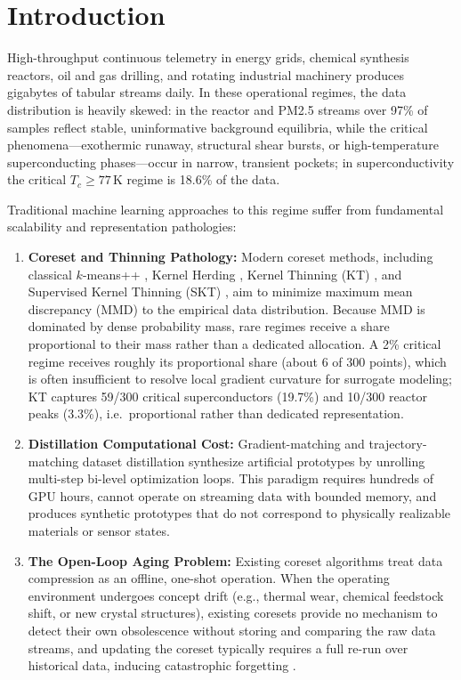 \documentclass[11pt,a4paper]{article}
\begin{document}
\section{Introduction}

High-throughput continuous telemetry in energy grids, chemical synthesis reactors, oil and gas drilling, and rotating industrial machinery produces gigabytes of tabular streams daily. In these operational regimes, the data distribution is heavily skewed: in the reactor and PM2.5 streams over 97\% of samples reflect stable, uninformative background equilibria, while the critical phenomena---exothermic runaway, structural shear bursts, or high-temperature superconducting phases---occur in narrow, transient pockets; in superconductivity the critical $T_c \ge 77\,\mathrm{K}$ regime is 18.6\% of the data.

Traditional machine learning approaches to this regime suffer from fundamental scalability and representation pathologies:
\begin{enumerate}
    \item \textbf{Coreset and Thinning Pathology:} Modern coreset methods, including classical $k$-means++ \citep{bachem2017practical}, Kernel Herding \citep{chen2010super}, Kernel Thinning (KT) \citep{dwivedi2024kernel}, and Supervised Kernel Thinning (SKT) \citep{gong2024supervised}, aim to minimize maximum mean discrepancy (MMD) to the empirical data distribution. Because MMD is dominated by dense probability mass, rare regimes receive a share proportional to their mass rather than a dedicated allocation. A 2\% critical regime receives roughly its proportional share (about 6 of 300 points), which is often insufficient to resolve local gradient curvature for surrogate modeling; KT captures 59/300 critical superconductors (19.7\%) and 10/300 reactor peaks (3.3\%), i.e.\ proportional rather than dedicated representation.
    \item \textbf{Distillation Computational Cost:} Gradient-matching and trajectory-matching dataset distillation \citep{wang2018dataset} synthesize artificial prototypes by unrolling multi-step bi-level optimization loops. This paradigm requires hundreds of GPU hours, cannot operate on streaming data with bounded memory, and produces synthetic prototypes that do not correspond to physically realizable materials or sensor states.
    \item \textbf{The Open-Loop Aging Problem:} Existing coreset algorithms treat data compression as an offline, one-shot operation. When the operating environment undergoes concept drift \citep{gama2014survey} (e.g., thermal wear, chemical feedstock shift, or new crystal structures), existing coresets provide no mechanism to detect their own obsolescence without storing and comparing the raw data streams, and updating the coreset typically requires a full re-run over historical data, inducing catastrophic forgetting \citep{kirkpatrick2017overcoming}.
\end{enumerate}
\end{document}
